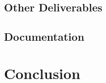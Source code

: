 \documentclass[paper=a4, fontsize=11pt]{report} %
\begin{document}

\section{Other Deliverables} %
\label{sec:other_deliverables}


\section{Documentation} %
\label{sec:documentation}




\chapter{Conclusion} %
\label{cha:conclusion}



\end{document}
